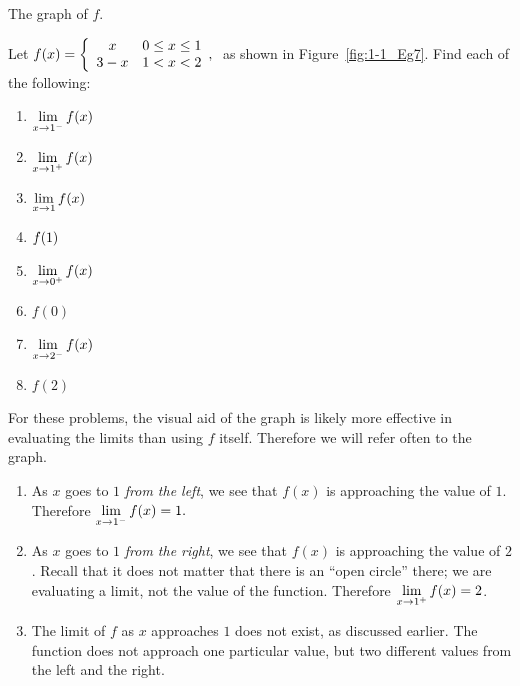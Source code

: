 \begin{marginfigure}[8cm]
\caption{The graph of $f$.}\label{fig:1-1_Eg7}
\end{marginfigure}


\begin{example} \label{Ex:1.1.Eg7}
Let $\displaystyle f(x) = \left\{\begin{array}{cc} x & 0\leq x\leq 1 \\ 3-x & 1<x<2\end{array},\right.$ as shown in Figure~\ref{fig:1-1_Eg7}. Find each of the following: 
\begin{multicols}{2}
\begin{enumerate}[1)]
\item		$\displaystyle \lim_{x\to 1^-} f(x)$
\item		$\displaystyle \lim_{x\to 1^+} f(x)$
\item		$\displaystyle \lim_{x\to 1} f(x)$
\item		$\displaystyle f(1)$
\item		$\displaystyle \lim_{x\to 0^+} f(x)$
\item		$f(0)$
\item		$\displaystyle \lim_{x\to 2^-} f(x)$
\item		$f(2)$
\end{enumerate}
\end{multicols}

\solution For these problems, the visual aid of the graph is likely more effective in evaluating the limits than using $f$ itself. Therefore we will refer often to the graph.
\begin{enumerate}[1)]
\item As $x$ goes to $1$ \textit{from the left}, we see that $f(x)$ is approaching the value of $1$. Therefore $\displaystyle \lim_{x\to 1^-} f(x) =1.$

\item As $x$ goes to $1$ \textit{from the right}, we see that $f(x)$ is approaching the value of $2$. Recall that it does not matter that there is an ``open circle'' there; we are evaluating a limit, not the value of the function. Therefore $\displaystyle \lim_{x\to 1^+} f(x)=2$.

\item The limit of $f$ as $x$ approaches $1$ does not exist, as discussed earlier. The function does not approach one particular value, but two different values from the left and the right.


\end{enumerate}
\end{example}
